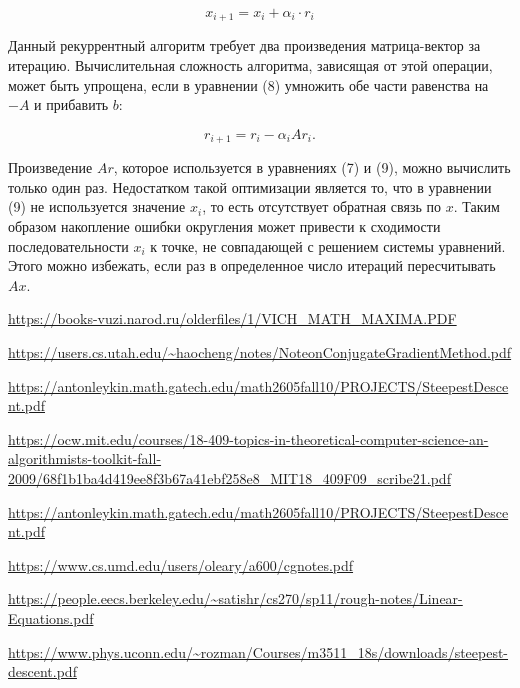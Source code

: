 \documentclass{article}
\begin{document}
\begin{equation}
    x_{i + 1} = x_i + \alpha_i \cdot r_i
\end{equation}

Данный рекуррентный алгоритм требует два произведения матрица-вектор за итерацию. Вычислительная сложность алгоритма, зависящая от этой 
операции, может быть упрощена, если в уравнении (8) умножить обе части равенства на $-A$ и прибавить $b$:

\begin{equation}
    r_{i + 1} = r_i - \alpha_i A r_i.
\end{equation}

Произведение $Ar$, которое используется в уравнениях (7) и (9), можно вычислить только один раз. Недостатком 
такой оптимизации является то, что в уравнении (9) не используется значение $x_i$, то есть отсутствует обратная связь по $x$.
Таким образом накопление ошибки округления может привести к сходимости последовательности ${x_i}$ к точке, не совпадающей с
решением системы уравнений. Этого можно избежать, если раз в определенное число итераций пересчитывать $Ax$.

 
\begin{thebibliography}{9}

  \url{https://books-vuzi.narod.ru/olderfiles/1/VICH_MATH_MAXIMA.PDF}



  \url{https://users.cs.utah.edu/~haocheng/notes/NoteonConjugateGradientMethod.pdf}

  \url{https://antonleykin.math.gatech.edu/math2605fall10/PROJECTS/SteepestDescent.pdf}


  \url{https://ocw.mit.edu/courses/18-409-topics-in-theoretical-computer-science-an-algorithmists-toolkit-fall-2009/68f1b1ba4d419ee8f3b67a41ebf258e8_MIT18_409F09_scribe21.pdf}


  \url{https://antonleykin.math.gatech.edu/math2605fall10/PROJECTS/SteepestDescent.pdf}

  \url{https://www.cs.umd.edu/users/oleary/a600/cgnotes.pdf}


  \url{https://people.eecs.berkeley.edu/~satishr/cs270/sp11/rough-notes/Linear-Equations.pdf}


  \url{https://www.phys.uconn.edu/~rozman/Courses/m3511_18s/downloads/steepest-descent.pdf}

\end{thebibliography}
\end{document}
